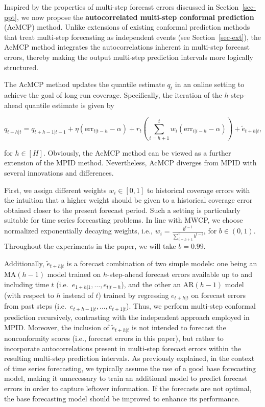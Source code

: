 \documentclass[
  11pt,
  a4paper,
]{article}
\theoremstyle{plain}
\theoremstyle{plain}
\theoremstyle{remark}
\begin{document}
Inspired by the properties of multi-step forecast errors discussed in
Section~\ref{sec-ppt}, we now propose the \textbf{autocorrelated
multi-step conformal prediction} (AcMCP) method. Unlike extensions of
existing conformal prediction methods that treat multi-step forecasting
as independent events (see Section~\ref{sec-ext}), the AcMCP method
integrates the autocorrelations inherent in multi-step forecast errors,
thereby making the output multi-step prediction intervals more logically
structured.

The AcMCP method updates the quantile estimate \(q_t\) in an online
setting to achieve the goal of long-run coverage. Specifically, the
iteration of the \(h\)-step-ahead quantile estimate is given by

\[
q_{t+h|t}=q_{t+h-1|t-1}+\eta \left(\mathrm{err}_{t|t-h}-\alpha\right)+r_t\left(\sum_{i=h+1}^t w_{i}\left(\mathrm{err}_{i|i-h}-\alpha\right)\right)+\tilde{e}_{t+h|t},
\]

for \(h\in[H]\). Obviously, the AcMCP method can be viewed as a further
extension of the MPID method. Nevertheless, AcMCP diverges from MPID
with several innovations and differences.

First, we assign different weights \(w_i \in [0,1]\) to historical
coverage errors with the intuition that a higher weight should be given
to a historical coverage error obtained closer to the present forecast
period. Such a setting is particularly suitable for time series
forecasting problems. In line with MWCP, we choose normalized
exponentially decaying weights, i.e.,
\(w_i = \frac{b^{t-i}}{\sum_{i=h+1}^{t}b^{t-i}}\), for \(b \in (0, 1)\).
Throughout the experiments in the paper, we will take \(b = 0.99\).

Additionally, \(\tilde{e}_{t+h|t}\) is a forecast combination of two
simple models: one being an MA\((h-1)\) model trained on
\(h\)-step-ahead forecast errors available up to and including time
\(t\) (i.e.~\(e_{1+h|1}, \ldots, e_{t|t-h}\)), and the other an
AR\((h-1)\) model (with respect to \(h\) instead of \(t\)) trained by
regressing \(e_{t+h|t}\) on forecast errors from past steps
(i.e.~\(e_{t+h-1|t}, \ldots, e_{t+1|t}\)). Thus, we perform multi-step
conformal prediction recursively, contrasting with the independent
approach employed in MPID. Moreover, the inclusion of
\(\tilde{e}_{t+h|t}\) is not intended to forecast the nonconformity
scores (i.e., forecast errors in this paper), but rather to incorporate
autocorrelations present in multi-step forecast errors within the
resulting multi-step prediction intervals. As previously explained, in
the context of time series forecasting, we typically assume the use of a
good base forecasting model, making it unnecessary to train an
additional model to predict forecast errors in order to capture leftover
information. If the forecasts are not optimal, the base forecasting
model should be improved to enhance its performance.
\end{document}
